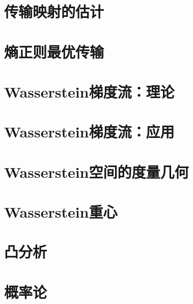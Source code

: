 \documentclass[UTF8,12pt]{ctexart}
\theoremstyle{plain}
\numberwithin{equation}{section}
\numberwithin{figure}{section}
\newif\ifInAppendix
\newif\ifInAppendixToc
\let\OriginalAppendix\appendix
\renewcommand{\appendix}{%
  \OriginalAppendix
  \InAppendixtrue
  \addtocontents{toc}{\protect\InAppendixToctrue}%
}
\begin{document}
\section{传输映射的估计}\label{sec:3}








\section{熵正则最优传输}\label{sec:4}






\section{Wasserstein梯度流：理论}\label{sec:5}










\section{Wasserstein梯度流：应用}\label{sec:6}








\section{Wasserstein空间的度量几何}\label{sec:7}





\section{Wasserstein重心}\label{sec:8}





\appendix
\section{凸分析}\label{sec:A}



\section{概率论}\label{sec:B}


\clearpage{}
\nocite{*}



\printindex

\end{document}
